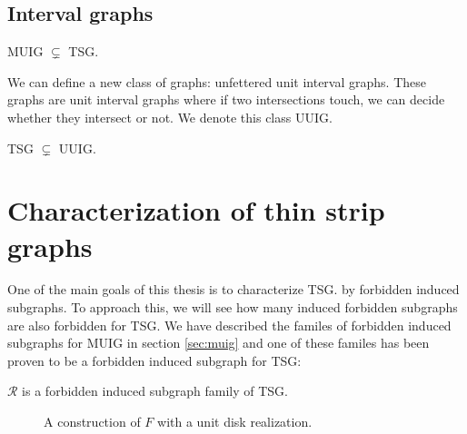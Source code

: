 \subsection{Interval graphs}

\begin{theorem}
  MUIG $\subsetneq$ TSG.
\end{theorem}

We can define a new class of graphs: unfettered unit interval graphs. These graphs
are unit interval graphs where if two intersections touch, we can decide whether
they intersect or not. We denote this class UUIG.

\begin{theorem}
  TSG $\subsetneq$ UUIG.
\end{theorem}


\section{Characterization of thin strip graphs}

One of the main goals of this thesis is to characterize TSG. by forbidden induced subgraphs. To approach this, we will see how many induced forbidden subgraphs are also forbidden for TSG. We have described the familes of forbidden induced subgraphs for MUIG in section \ref{sec:muig} and one of these familes has been proven to be a forbidden induced subgraph for TSG:

\begin{theorem}
  $\mathcal{R}$ is a forbidden induced subgraph family of TSG.
\end{theorem}

\begin{figure}
\centering

\begin{scaletikzpicturetowidth}{\textwidth}
\end{scaletikzpicturetowidth}

\caption{A construction of $F$ with a unit disk realization.}
\label{fig:fUDG}
\end{figure}


